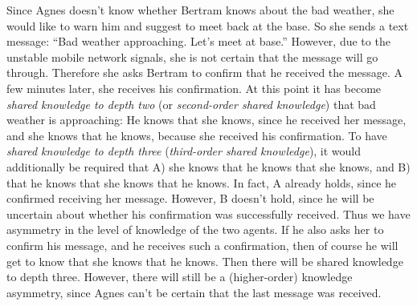 \documentclass[twocolumn,a4paper,superscriptaddress,nofootinbib]{revtex4}
\begin{document}
Since Agnes doesn't know whether Bertram knows about the bad weather, she would like to warn him and suggest to meet back at the base. So she sends a text message: ``Bad weather approaching. Let's meet at base.'' However, due to the unstable mobile network signals, she is not certain that the message will go through. Therefore she asks Bertram to confirm that he received the  message. A few minutes later, she receives his confirmation. At this point it has become \emph{shared knowledge to depth two} (or \emph{second-order shared knowledge}) that bad weather is approaching: He knows that she knows, since he received her message, and she knows that he knows, because she received his confirmation. To have \emph{shared knowledge to depth three} (\emph{third-order shared knowledge}), it would additionally be required that A) she knows that he knows that she knows, and B) that he knows that she knows that he knows. In fact, A already holds, since he confirmed receiving her message. However, B doesn't hold, since he will be uncertain about whether his confirmation was successfully received. Thus we have asymmetry in the level of knowledge of the two agents. If he also asks her to confirm his message, and he receives such a confirmation, then of course he will get to know that she knows that he knows. Then there will be shared knowledge to depth three. However, there will still be a (higher-order) knowledge asymmetry, since Agnes can't be certain that the last message was received.
\end{document}
